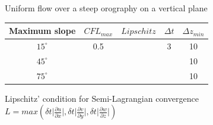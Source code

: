 \documentclass{beamer}
\begin{document}


\begin{frame}{Uniform flow over a steep orography on a vertical plane}

    \begin{center}
        \begin{tabular}{|c|c|c|c|c|}
            \hline
              Maximum slope & $CFL_{max}$ & $Lipschitz$ & $\Delta t$ & $\Delta z_{min}$\\
            \hline
            $15^{\circ}$ & 0.5 &  &  3 &  10 \\
            \hline
            $45^{\circ}$ &  &  &  & 10 \\
            \hline
            $75^{\circ}$ &  &  &  & 10 \\
            \hline 
        \end{tabular}       
    \end{center}

    \begin{block}{Lipschitz' condition for Semi-Lagrangian convergence} 
        $L = max(\delta t \lvert \frac{\partial u}{\partial x} \rvert, \delta t \lvert \frac{\partial v}{\partial y} \rvert, \delta t \lvert \frac{\partial w}{\partial z} \rvert)$
    \end{block}

\end{frame}

\end{document}
